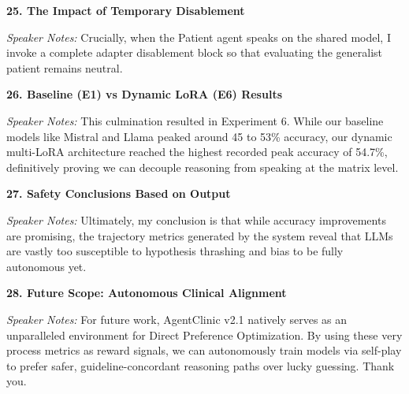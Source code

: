 \documentclass[12pt]{article}
\begin{document}
\begin{description}
\item \textbf{25. The Impact of Temporary Disablement}
\par\textit{Speaker Notes:} Crucially, when the Patient agent speaks on the shared model, I invoke a complete adapter disablement block so that evaluating the generalist patient remains neutral. 

\item \textbf{26. Baseline (E1) vs Dynamic LoRA (E6) Results}
\par\textit{Speaker Notes:} This culmination resulted in Experiment 6. While our baseline models like Mistral and Llama peaked around 45 to 53\% accuracy, our dynamic multi-LoRA architecture reached the highest recorded peak accuracy of 54.7\%, definitively proving we can decouple reasoning from speaking at the matrix level.

\item \textbf{27. Safety Conclusions Based on Output}
\par\textit{Speaker Notes:} Ultimately, my conclusion is that while accuracy improvements are promising, the trajectory metrics generated by the system reveal that LLMs are vastly too susceptible to hypothesis thrashing and bias to be fully autonomous yet. 

\item \textbf{28. Future Scope: Autonomous Clinical Alignment}
\par\textit{Speaker Notes:} For future work, AgentClinic v2.1 natively serves as an unparalleled environment for Direct Preference Optimization. By using these very process metrics as reward signals, we can autonomously train models via self-play to prefer safer, guideline-concordant reasoning paths over lucky guessing. Thank you.

\end{description}
\end{document}
